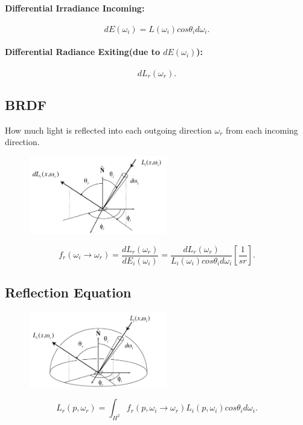 \documentclass[10pt,landscape,a4paper] {extarticle}
\begin{document}
\begin{multicols}{3}
\paragraph{Differential Irradiance Incoming:} 
\[
	dE(\omega_{i}) = L(\omega_{i})cos\theta_{i}d\omega_{i}
.\]
\paragraph{Differential Radiance Exiting(due to $dE(\omega_{i})$):} 
\[
	dL_{r}(\omega_{r})
.\] 

\subsection{BRDF}

How much light is reflected into each outgoing direction $\omega_{r}$ from each incoming direction.

\begin{figure}[H]
\centering
\includegraphics[width=6cm]{img/brdf.png}
\end{figure}

\[
	f_{r}(\omega_{i} \rightarrow \omega_{r}) 
	= \frac{dL_{r}(\omega_{r})}{dE_{i}(\omega_{i})}
	= \frac{dL_{r}(\omega_{r})}{L_{i}(\omega_{i})cos\theta_{i}d\omega_{i}}
	\left [ \frac{1}{sr} \right ]
.\] 

\subsection{Reflection Equation}

\begin{figure}[H]
\centering
\includegraphics[width=6cm]{img/reflection_equation.png}
\end{figure}

\[
	L_{r}(p,\omega_{r}) = \int_{H^2} f_{r}(p,\omega_{i} \rightarrow \omega_{r}) L_{i}(p,\omega_{i})cos\theta_{i}d\omega_{i}
.\] 

\end{multicols}
\end{document}
